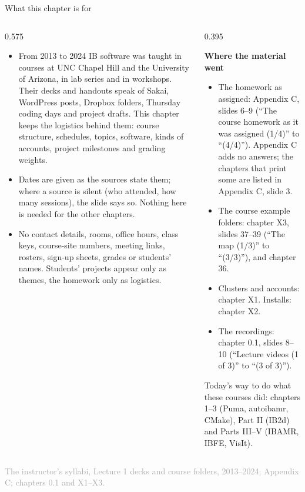\documentclass[aspectratio=169,11pt]{beamer}
\newcommand{\sourcecredit}[1]{\vfill\begin{flushright}\tiny\textcolor{DarkGray}{#1}\end{flushright}}
\begin{document}
\begin{frame}{What this chapter is for}
\label{fr:use}
\begin{columns}[T,onlytextwidth]
\begin{column}{0.575\textwidth}
\footnotesize
\begin{itemize}\setlength{\itemsep}{0.5pt}
  \item {} From 2013 to 2024 IB software was taught in courses at UNC Chapel Hill and the University of Arizona, in lab series and in workshops. Their decks and handouts speak of Sakai, WordPress posts, Dropbox folders, Thursday coding days and project drafts. This chapter keeps the logistics behind them: course structure, schedules, topics, software, kinds of accounts, project milestones and grading weights.
  \item {} Dates are given as the sources state them; where a source is silent (who attended, how many sessions), the slide says so. Nothing here is needed for the other chapters.
  \item {} No contact details, rooms, office hours, class keys, course-site numbers, meeting links, rosters, sign-up sheets, grades or students' names. Students' projects appear only as themes, the homework only as logistics.
\end{itemize}
\end{column}
\begin{column}{0.395\textwidth}
\begin{punchbox}
\scriptsize \textbf{Where the material went}
\begin{itemize}\setlength{\itemsep}{1pt}
  \item The homework as assigned: Appendix C, slides 6--9 (``The course homework as it was assigned (1/4)'' to ``(4/4)''). Appendix C adds no answers; the chapters that print some are listed in Appendix C, slide 3.
  \item The course example folders: chapter X3, slides 37--39 (``The map (1/3)'' to ``(3/3)''), and chapter 36.
  \item Clusters and accounts: chapter X1. Installs: chapter X2.
  \item The recordings: chapter 0.1, slides 8--10 (``Lecture videos (1 of 3)'' to ``(3 of 3)'').
\end{itemize}
\end{punchbox}
\vspace{1mm}
\scriptsize Today's way to do what these courses did: chapters 1--3 (Puma, autoibamr, CMake), Part II (IB2d) and Parts III--V (IBAMR, IBFE, VisIt).
\end{column}
\end{columns}
\sourcecredit{The instructor's syllabi, Lecture 1 decks and course folders, 2013--2024; Appendix C; chapters 0.1 and X1--X3.}
\end{frame}
\end{document}
